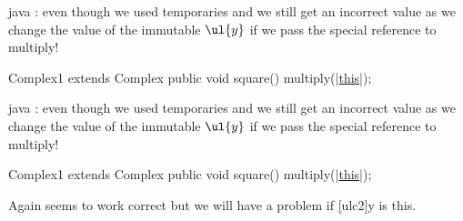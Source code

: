 \begin{codeboxcomment}[Complex]{0.45}{java}{
		: even though we used temporaries  and
     we still get an incorrect value as we change the value of
    the immutable $\ul{y}$ if we pass the special  reference to multiply!
  }
	
  Complex1 extends Complex{
    public void square(){
      multiply(|\ul{this}|);
    }
  }
\end{codeboxcomment}
\begin{codeboxcomment}[Complex]{0.45}{java}{
		: even though we used temporaries  and
     we still get an incorrect value as we change the value of
    the immutable $\ul{y}$ if we pass the special  reference to multiply!
  }
	
  Complex1 extends Complex{
    public void square(){
      multiply(|\ul{this}|);
    }
  }
\end{codeboxcomment}
\begin{notebox}[Note]\nospacing
 Again seems to work correct but we will have a problem if \ul[ulc2]{y} is
 this.
\end{notebox}
